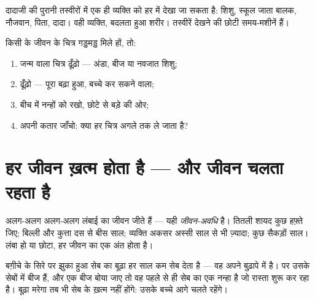 \begin{example}[तस्वीरों की जाँच]\label{ex:g2:born-grow-die:photo}
दादाजी की पुरानी तस्वीरों में एक ही व्यक्ति को हर  में देखा जा
सकता है: शिशु, स्कूल जाता बालक, नौजवान, पिता, दादा। वही व्यक्ति,
बदलता हुआ शरीर। तस्वीरें  देखने की छोटी समय-मशीनें हैं।
\end{example}

\begin{method}[जीवन की अवस्थाओं को क्रम में लगाना]\label{met:g2:born-grow-die:order}
किसी  के जीवन के चित्र गड्डमड्ड मिले हों, तो:
\begin{enumerate}
  \item जन्म वाला चित्र ढूँढ़ो --- अंडा, बीज या नवजात शिशु;
  \item {} ढूँढ़ो --- पूरा बढ़ा हुआ, बच्चे कर सकने वाला;
  \item बीच में नन्हों को रखो, छोटे से बड़े की ओर;
  \item अपनी कतार जाँचो: क्या हर चित्र अगले तक ले जाता है?
\end{enumerate}
\end{method}

\section{हर जीवन ख़त्म होता है --- और जीवन चलता रहता है}

\begin{proposition}[जीवन-अवधि]\label{prop:g2:born-grow-die:lifespan}
अलग-अलग  अलग-अलग लंबाई का जीवन जीते हैं --- यही
\emph{जीवन-अवधि} है। तितली शायद कुछ हफ़्ते जिए;
बिल्ली और कुत्ता दस से बीस साल; व्यक्ति अकसर अस्सी साल से भी ज़्यादा;
कुछ  सैकड़ों साल। लंबा हो या छोटा, हर जीवन का एक अंत होता है।
\end{proposition}
\admitted

\begin{example}[सेब का बूढ़ा पेड़]\label{ex:g2:born-grow-die:oldtree}
बग़ीचे के सिरे पर झुका हुआ सेब का बूढ़ा  हर साल कम सेब देता है ---
वह अपने बुढ़ापे में है। पर उसके सेबों में बीज हैं, और एक बीज बोया जाए
तो वह पहले से ही सेब का एक नन्हा  है जो रास्ता शुरू कर रहा है।
बूढ़ा  मरेगा तब भी सेब के  ख़त्म नहीं होंगे: उसके बच्चे आगे
चलते रहेंगे।
\end{example}

